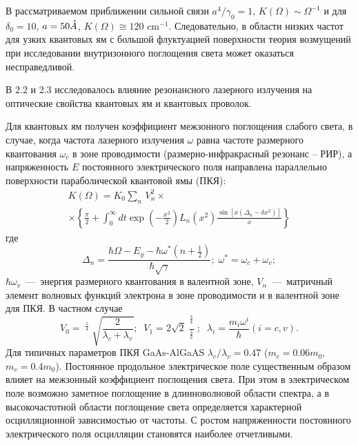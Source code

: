 В рассматриваемом приближении сильной связи $a^4 /\gamma_0 =1$, $K(\Omega )\sim \Omega ^{-1} $ и для $\delta_0 =10$, $a=50 \AA$, $K(\Omega )\cong 120 \text{ cm}^{-1} $. Следовательно, в области низких частот для узких квантовых ям с большой флуктуацией поверхности теория возмущений при исследовании внутризонного поглощения света может оказаться несправедливой.

В 2.2 и 2.3 исследовалось влияние резонансного лазерного излучения на оптические свойства квантовых ям и квантовых проволок.

Для квантовых ям получен коэффициент межзонного поглощения слабого света, в случае, когда частота лазерного излучения $\omega $ равна частоте размерного квантования $\omega_c $ в зоне проводимости (размерно-инфракрасный резонанс -- РИР), а напряженность $E$ постоянного электрического поля направлена параллельно поверхности параболической квантовой ямы (ПКЯ): 
\begin{multline} \label{eq:syn_11} 
K(\Omega )=K_0 \sum _{n} \, V_n^2 \times  \\
\times \left\{\frac{\pi }{2} +\int_0^{\infty } dt \exp \left(-\frac{x^2 }{2} \right)L_n \left(x^2 \right)\frac{\sin \left[x\left(\Delta_n -\delta x^2 \right)\right]}{x} \right\}
\end{multline} 
где 
\[\Delta_n =\frac{\hbar \Omega -E_g -\hbar \omega^* \left(n+{\tfrac{1}{2}} \right)}{\hbar \sqrt{\gamma } } ; \; \omega^* =\omega_c +\omega_v ;\] 
$\hbar \omega_v $~---~энергия размерного квантования в валентной зоне, $V_n $~---~матричный элемент волновых функций электрона в зоне проводимости и в валентной зоне для ПКЯ. В частном случае 
\[V_0 =\mathop{\left(\lambda_c \lambda_v \right)}\nolimits^{{\tfrac{1}{4}} } \sqrt{\frac{2}{\lambda_c +\lambda_v } } ;\; \; V_1 =2\sqrt{2} \frac{\mathop{\left(\lambda_c \lambda_v \right)}\nolimits^{{\tfrac{3}{4}} } }{\mathop{\left(\lambda_c +\lambda_v \right)}\nolimits^{{\tfrac{3}{2}} } } ;\; \; \lambda_i =\frac{m_i \omega^i }{\hbar } (i=c,v).\] 
Для типичных параметров ПКЯ GaAs-AlGaAS $\lambda_c /\lambda_v =0.47$ ($m_c =0.06m_0 ,$ $m_v =0.4m_0 $). Постоянное продольное электрическое поле существенным образом влияет на межзонный коэффициент поглощения света. При этом в электрическом поле возможно заметное поглощение в длинноволновой области спектра, а в высокочастотной области поглощение света определяется характерной осцилляционной зависимостью от частоты. С ростом напряженности постоянного электрического поля осцилляции становятся наиболее отчетливыми.

